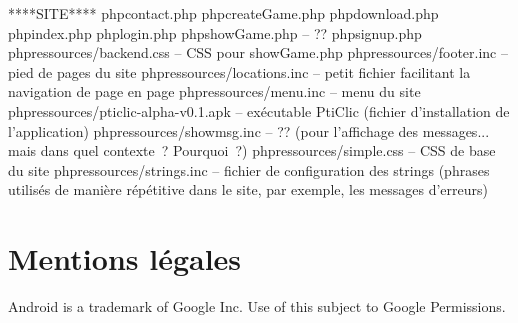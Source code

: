 \documentclass[a4paper,11pt,french]{article}
\begin{document}
****SITE****
php\/contact.php
php\/createGame.php
php\/download.php
php\/index.php
php\/login.php
php\/showGame.php -- ??
php\/signup.php
php\/ressources/backend.css  -- CSS pour showGame.php
php\/ressources/footer.inc  -- pied de pages du site
php\/ressources/locations.inc  -- petit fichier facilitant la navigation de page en page
php\/ressources/menu.inc  -- menu du site
php\/ressources/pticlic-alpha-v0.1.apk  -- exécutable PtiClic (fichier d'installation de l'application)
php\/ressources/showmsg.inc  -- ?? (pour l'affichage des messages... mais dans quel contexte~? Pourquoi~?)
php\/ressources/simple.css  -- CSS de base du site
php\/ressources/strings.inc -- fichier de configuration des strings (phrases utilisés de manière répétitive dans le site, par exemple, les messages d'erreurs)

\section{Mentions légales}
Android is a trademark of Google Inc. Use of this subject to Google Permissions.
\end{document}
